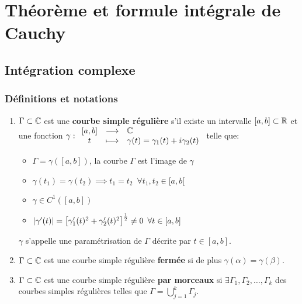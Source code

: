 \chapter{Théorème et formule intégrale de Cauchy}


\section{Intégration complexe}

\subsection{Définitions et notations}

\begin{definition}\hfill
\begin{enumerate}[label=\arabic{enumi})]
    \item
    $\Gamma \subset \mathbb{C}$ est une \textbf{courbe simple régulière} s'il existe un intervalle $[a,b] \subset \mathbb{R}$ et une fonction $\gamma: \begin{array}{ccl} [a,b] & \longrightarrow & \mathbb{C}\\ t & \longmapsto & \gamma(t) = \gamma_1(t) + i\gamma_2(t)\end{array}$ telle que:
    
    \begin{itemize}
    \item $\Gamma = \gamma([a,b])$, la courbe $\Gamma$ est l'image de $\gamma$
    \item $\gamma(t_1) = \gamma(t_2) \implies t_1 = t_2 \enspace \forall t_1,t_2 \in [a,b[$
    \item $\gamma \in C^1\left([a,b]\right)$
    \item $\left|\gamma'(t)\right| = \left[\gamma_1'(t)^2 + \gamma_2'(t)^2\right]^\frac{1}{2} \neq 0 \enspace \forall t \in [a,b]$
    \end{itemize}

    $\gamma$ s'appelle une paramétrisation de $\Gamma$ décrite par $t \in [a,b]$.
    
    \item
    $\Gamma \subset \mathbb{C}$ est une courbe simple régulière \textbf{fermée} si de plus $\gamma(\alpha) = \gamma(\beta)$.
    
    \item
    $\Gamma \subset \mathbb{C}$ est une courbe simple régulière \textbf{par morceaux} si $\exists \Gamma_1, \Gamma_2,\ldots,\Gamma_k$ des courbes simples régulières telles que $\Gamma = \bigcup\limits_{j = 1}^k \Gamma_j$.
    

\end{enumerate}
\end{definition}
